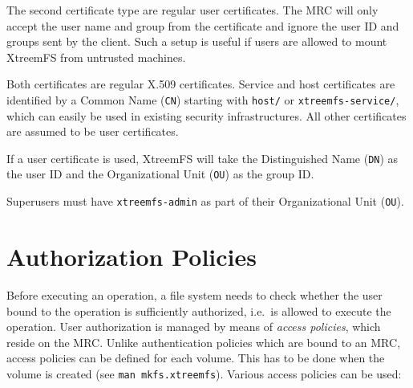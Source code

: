 \documentclass[a4paper,10pt]{book}
\begin{document}
The second certificate type are regular user certificates. The MRC will only accept the user name and group from the certificate and ignore the user ID and groups sent by the client. Such a setup is useful if users are allowed to mount XtreemFS from untrusted machines.

Both certificates are regular X.509 certificates. Service and host certificates are identified by a Common Name (\texttt{CN}) starting with \texttt{host/} or \texttt{xtreemfs-service/}, which can easily be used in existing security infrastructures. All other certificates are assumed to be user certificates.

If a user certificate is used, XtreemFS will take the Distinguished Name (\texttt{DN}) as the user ID and the Organizational Unit (\texttt{OU}) as the group ID.

Superusers must have \texttt{xtreemfs-admin} as part of their Organizational Unit (\texttt{OU}).


\section{Authorization Policies} \label{sec:access_policies}
Before executing an operation, a file system needs to check whether the user bound to the operation is sufficiently authorized, i.e.\ is allowed to execute the operation. User authorization is managed by means of \emph{access policies}, which reside on the MRC. Unlike authentication policies which are bound to an MRC, access policies can be defined for each volume. This has to be done when the volume is created (see \texttt{man mkfs.xtreemfs}). Various access policies can be used: 
\end{document}
